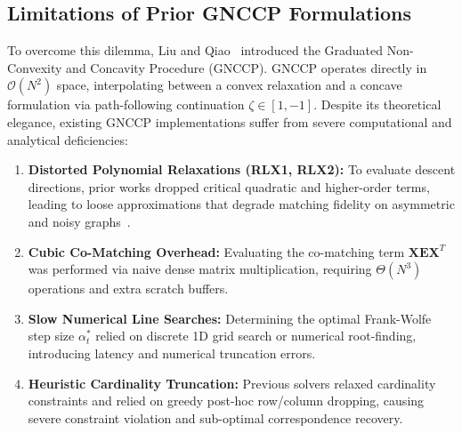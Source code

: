\documentclass[a4paper,fleqn]{cas-dc}
\theoremstyle{thmstyleone}
\theoremstyle{thmstyletwo}
\theoremstyle{thmstylethree}
\begin{document}
\subsection{Limitations of Prior GNCCP Formulations}
To overcome this dilemma, Liu and Qiao~\cite{liu2015graduated, yang2018algorithm} introduced the Graduated Non-Convexity and Concavity Procedure (GNCCP). GNCCP operates directly in $\mathcal{O}(N^2)$ space, interpolating between a convex relaxation and a concave formulation via path-following continuation $\zeta \in [1, -1]$. Despite its theoretical elegance, existing GNCCP implementations suffer from severe computational and analytical deficiencies:
\begin{enumerate}
    \item \textbf{Distorted Polynomial Relaxations (RLX1, RLX2):} To evaluate descent directions, prior works dropped critical quadratic and higher-order terms, leading to loose approximations that degrade matching fidelity on asymmetric and noisy graphs~\cite{yang2018algorithm}.
    \item \textbf{Cubic Co-Matching Overhead:} Evaluating the co-matching term $\mathbf{X}\mathbf{E}\mathbf{X}^T$ was performed via naive dense matrix multiplication, requiring $\Theta(N^3)$ operations and extra scratch buffers.
    \item \textbf{Slow Numerical Line Searches:} Determining the optimal Frank-Wolfe step size $\alpha_t^*$ relied on discrete 1D grid search or numerical root-finding, introducing latency and numerical truncation errors.
    \item \textbf{Heuristic Cardinality Truncation:} Previous solvers relaxed cardinality constraints and relied on greedy post-hoc row/column dropping, causing severe constraint violation and sub-optimal correspondence recovery.
\end{enumerate}
\end{document}
